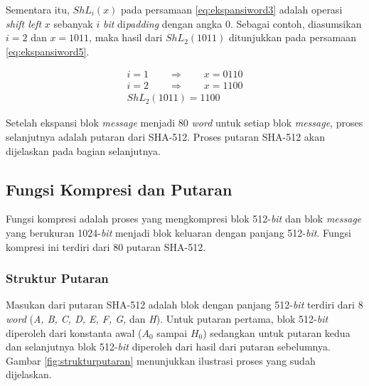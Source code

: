 Sementara itu, \begin{math}ShL_i(x)\end{math} pada persamaan \ref{eq:ekspansiword3} adalah operasi \textit{shift left} \begin{math}x\end{math} sebanyak \begin{math}i\end{math} \textit{bit} di\textit{padding} dengan angka 0. Sebagai contoh, diasumsikan \begin{math}i=2\end{math} dan \begin{math}x=1011\end{math}, maka hasil dari \begin{math}ShL_2(1011)\end{math} ditunjukkan pada persamaan \ref{eq:ekspansiword5}.

\begin{align}
	i = 1 \qquad\Rightarrow\qquad x = 0110 \nonumber \\
	i = 2 \qquad\Rightarrow\qquad x = 1100 \label{eq:ekspansiword5} \\
	ShL_2(1011) = 1100 \nonumber
\end{align}

Setelah ekspansi blok \textit{message} menjadi 80 \textit{word} untuk setiap blok \textit{message}, proses selanjutnya adalah putaran dari SHA-512. Proses putaran SHA-512 akan dijelaskan pada bagian selanjutnya.

\subsection{Fungsi Kompresi dan Putaran}

Fungsi kompresi adalah proses yang mengkompresi blok 512-\textit{bit} dan blok \textit{message} yang berukuran 1024-\textit{bit} menjadi blok keluaran dengan panjang 512-\textit{bit}. Fungsi kompresi ini terdiri dari 80 putaran SHA-512. 

\subsubsection{Struktur Putaran}

Masukan dari putaran SHA-512 adalah blok dengan panjang 512-\textit{bit} terdiri dari 8 \textit{word} (\textit{A, B, C, D, E, F, G,} dan \textit{H}). Untuk putaran pertama, blok 512-\textit{bit} diperoleh dari konstanta awal (\begin{math}A_0\end{math} sampai \begin{math}H_0\end{math}) sedangkan untuk putaran kedua dan selanjutnya blok 512-\textit{bit} diperoleh dari hasil dari putaran sebelumnya. Gambar \ref{fig:strukturputaran} menunjukkan ilustrasi proses yang sudah dijelaskan.

